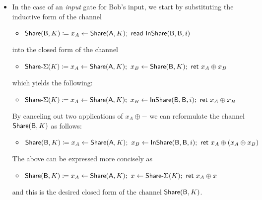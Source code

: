 \begin{itemize}
\item In the case of an \emph{input} gate for Bob's input, we start by substituting the inductive form of the channel
\begin{itemize}
\item $\mathsf{Share}(\mathsf{B},K) \coloneqq x_A \leftarrow \mathsf{Share}(\mathsf{A},K); \ \mathsf{read} \ \mathsf{InShare}(\mathsf{B},\mathsf{B},i)$
\end{itemize}
into the closed form of the channel
\begin{itemize}
\item $\mathsf{Share}\textsf{-}\Sigma(K) \coloneqq x_A \leftarrow \mathsf{Share}(\mathsf{A},K); \ x_B \leftarrow \mathsf{Share}(\mathsf{B},K); \ \mathsf{ret} \ x_A \oplus x_B$
\end{itemize}
which yields the following:
\begin{itemize}
\item $\mathsf{Share}\textsf{-}\Sigma(K) \coloneqq x_A \leftarrow \mathsf{Share}(\mathsf{A},K); \ x_B \leftarrow \mathsf{InShare}(\mathsf{B},\mathsf{B},i); \ \mathsf{ret} \ x_A \oplus x_B$
\end{itemize}
By canceling out two applications of $x_A \oplus -$ we can reformulate the channel $\mathsf{Share}(\mathsf{B},K)$ as follows:
\begin{itemize}
\item $\mathsf{Share}(\mathsf{B},K) \coloneqq x_A \leftarrow \mathsf{Share}(\mathsf{A},K); \ x_B \leftarrow \mathsf{InShare}(\mathsf{B},\mathsf{B},i); \ \mathsf{ret} \ x_A \oplus (x_A \oplus x_B)$
\end{itemize}
The above can be expressed more concisely as
\begin{itemize}
\item $\mathsf{Share}(\mathsf{B},K) \coloneqq x_A \leftarrow \mathsf{Share}(\mathsf{A},K); \ x \leftarrow \mathsf{Share}\textsf{-}\Sigma(K); \ \mathsf{ret} \ x_A \oplus x$
\end{itemize}
and this is the desired closed form of the channel $\mathsf{Share}(\mathsf{B},K)$.


\end{itemize}
